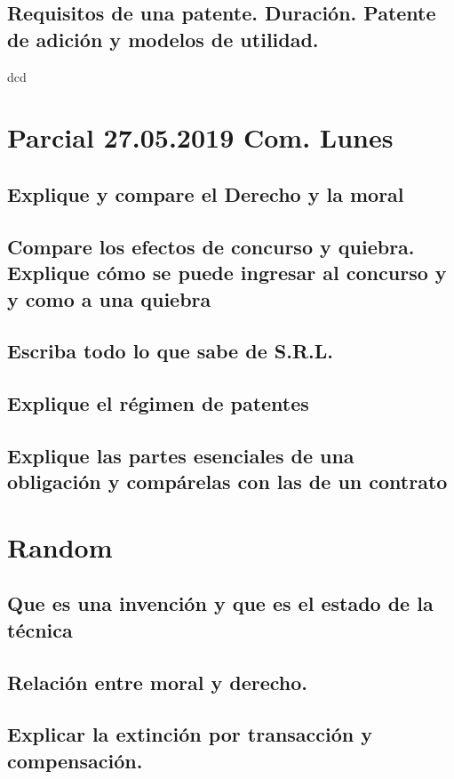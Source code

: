\documentclass{article}
\begin{document}
\subsection{Requisitos de una patente. Duración. Patente de adición y modelos de utilidad.}
dcd


\section{Parcial 27.05.2019 Com. Lunes}
\subsection{Explique y compare el Derecho y la moral }

\subsection{Compare los efectos de concurso y quiebra. Explique cómo se puede ingresar al concurso y y como a una quiebra}

\subsection{Escriba todo lo que sabe de S.R.L.}

\subsection{Explique el régimen de patentes}

\subsection{Explique las partes esenciales de una obligación y compárelas con las de un contrato}

\setcounter{section}{-1}
\section{Random}
\subsection{Que es una invención y que es el estado de la técnica}

\subsection{Relación entre moral y derecho.}

\subsection{Explicar la extinción por transacción y compensación.}
\end{document}
